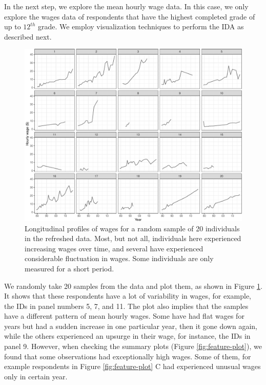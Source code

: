 \documentclass{article}
\begin{document}
In the next step, we explore the mean hourly wage data. In this case, we only explore the wages data of respondents that have the highest completed grade of up to \(12^{th}\) grade. We employ visualization techniques to perform the IDA as described next.

\begin{figure}

{\centering \includegraphics[width=1\linewidth]{figures/sample-plot-1} 

}

\caption{Longitudinal profiles of wages for a random sample of 20 individuals in the refreshed data. Most, but not all, individuals here experienced increasing wages over time, and several have experienced considerable fluctuation in wages. Some individuals are only measured for a short period.}\label{fig:sample-plot}
\end{figure}

We randomly take 20 samples from the data and plot them, as shown in Figure \ref{fig:sample-plot}. It shows that these respondents have a lot of variability in wages, for example, the IDs in panel numbers 5, 7, and 11. The plot also implies that the samples have a different pattern of mean hourly wages. Some have had flat wages for years but had a sudden increase in one particular year, then it gone down again, while the others experienced an upsurge in their wage, for instance, the IDs in panel 9.
However, when checking the summary plots (Figure \ref{fig:feature-plot}), we found that some observations had exceptionally high wages. Some of them, for example respondents in Figure \ref {fig:feature-plot} C had experienced unusual wages only in certain year.
\end{document}
